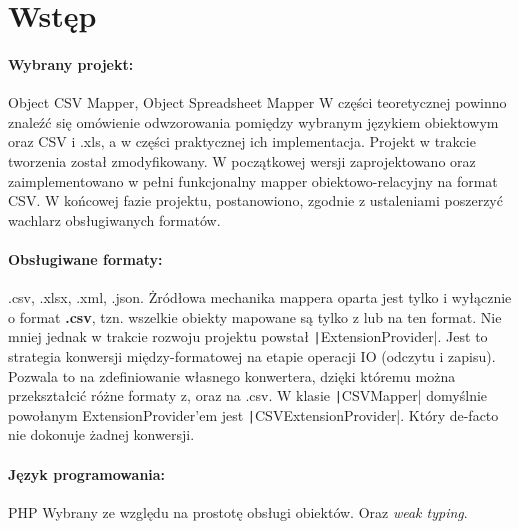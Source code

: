 \section{Wstęp}
\paragraph{Wybrany projekt:} Object CSV Mapper, Object Spreadsheet Mapper \newline
W części teoretycznej powinno znaleźć się omówienie odwzorowania pomiędzy wybranym językiem obiektowym oraz CSV i .xls, a w części praktycznej ich implementacja. Projekt w trakcie tworzenia został zmodyfikowany. W początkowej wersji zaprojektowano oraz zaimplementowano w pełni funkcjonalny mapper obiektowo-relacyjny na format CSV. W końcowej fazie projektu, postanowiono, zgodnie z ustaleniami poszerzyć wachlarz obsługiwanych formatów. 

\paragraph{Obsługiwane formaty:} .csv, .xlsx, .xml, .json.
Żródłowa mechanika mappera oparta jest tylko i wyłącznie o format \textbf{.csv}, tzn. wszelkie obiekty mapowane są tylko z lub na ten format. Nie mniej jednak w trakcie rozwoju projektu powstał \texttt|ExtensionProvider|. Jest to strategia konwersji między-formatowej na etapie operacji IO (odczytu i zapisu). Pozwala to na zdefiniowanie własnego konwertera, dzięki któremu można przekształcić różne formaty z, oraz na .csv. W klasie  \texttt|CSVMapper| domyślnie powołanym ExtensionProvider'em jest \texttt|CSVExtensionProvider|. Który de-facto nie dokonuje żadnej konwersji.

\paragraph{Język programowania:} PHP\newline
Wybrany ze względu na prostotę obsługi obiektów. Oraz \textit{weak typing}. 

